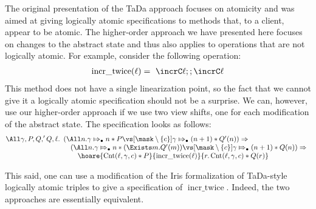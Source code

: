 The original presentation of the TaDa approach focuses on atomicity and was aimed at giving logically atomic specifications
to methods that, to a client, appear to be atomic.  The higher-order approach we have presented here focuses on
changes to the abstract state and thus also applies to operations that are not logically atomic. 
For example, consider the following operation:
\newcommand{\incTwice}{\operatorname{incr\_twice}}
\begin{align*}
  \incTwice (\ell) =\ \incrC \ell ;; \incrC \ell
\end{align*}
This method does not have a single linearization point, so the fact that we cannot give it a logically atomic specification should not be a surprise.
We can, however, use our higher-order approach if we use two view shifts, one for each modification of the abstract state.
The specification looks as follows:
\begin{align*}
  \All \gamma, P, Q,' Q, \ell.
  \begin{array}[t]{l}
    \left(\All n. \abstractstateauth{\gamma}{n} \ast P \vs[\mask\setminus{\{\CntInvName\}}]
    \abstractstateauth{\gamma}{(n+1)} \ast Q' (n) \right) \implies \\
    \quad \left(\All n. \abstractstateauth{\gamma}{n} \ast (\Exists m. Q' (m)) \vs[\mask\setminus{\{\CntInvName\}}]
    \abstractstateauth{\gamma}{(n+1)} \ast Q (n)\right) \implies \\
    \quad \quad \hoare{\Cnt (\ell, \gamma, c) \ast P}{\incTwice (\ell)}{r. \Cnt (\ell, \gamma, c) \ast Q (r)}
    \end{array}
\end{align*}

This said, one can use a modification of the Iris formalization of TaDa-style logically atomic triples to give
a specification of $\incTwice$.
Indeed, the two approaches are essentially equivalent. 



